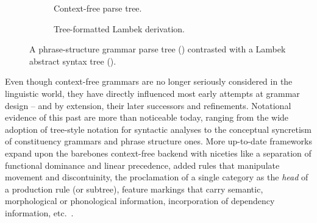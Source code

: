 \begin{figure}
	\centering
	\hfill%
	\begin{subfigure}[b]{0.35\textwidth}
		\caption{Context-free parse tree.}
		\label{subfigure:cfgtree}
	\end{subfigure}\hfill%
	\begin{subfigure}[b]{0.45\textwidth}
		\caption{Tree-formatted Lambek derivation.}
		\label{subfigure:lambektree}
	\end{subfigure}\hfill
	\caption{A phrase-structure grammar parse tree () contrasted with a Lambek abstract syntax tree ().}
	\label{figure:cfgvslambek}
\end{figure}

Even though context-free grammars are no longer seriously considered in the linguistic world, they have directly influenced most early attempts at grammar design -- and by extension, their later successors and refinements.
Notational evidence of this past are more than noticeable today, ranging from the wide adoption of tree-style notation for syntactic analyses to the conceptual syncretism of constituency grammars and phrase structure ones.
More up-to-date frameworks expand upon the barebones context-free backend with niceties like a separation of functional dominance and linear precedence, added rules that manipulate movement and discontuinity, the proclamation of a single category as the \textit{head} of a production rule (or subtree), feature markings that carry semantic, morphological or phonological information, incorporation of dependency information, etc.~\cite[\textit{inter alia}]{gazdar1985generalized,jacobson1987phrase,pollard1994head,dalrymple2001lexical}.

